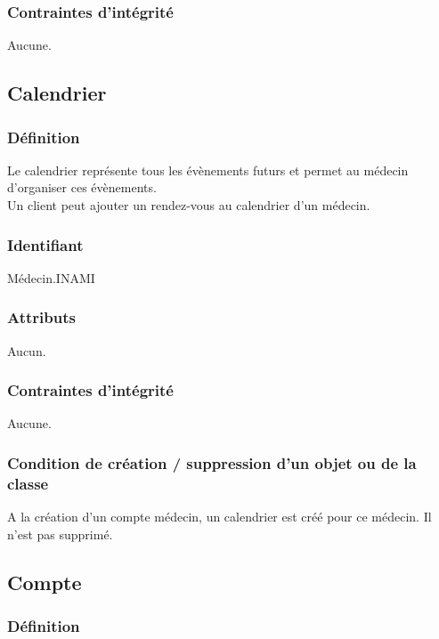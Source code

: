 \subsubsection{Contraintes d'intégrité}

Aucune.

\subsection{Calendrier}

\subsubsection{Définition}

Le calendrier représente tous les évènements futurs et permet
au médecin d'organiser ces évènements. \\
Un client peut ajouter un rendez-vous au calendrier d'un médecin.

\subsubsection{Identifiant}

Médecin.INAMI

\subsubsection{Attributs}

Aucun.

\subsubsection{Contraintes d'intégrité}

Aucune.

\subsubsection{Condition de création / suppression d'un objet ou de la classe}

A la création d'un compte médecin, un calendrier est créé pour ce médecin. 
Il n'est pas supprimé.


\subsection{Compte}

\subsubsection{Définition}

